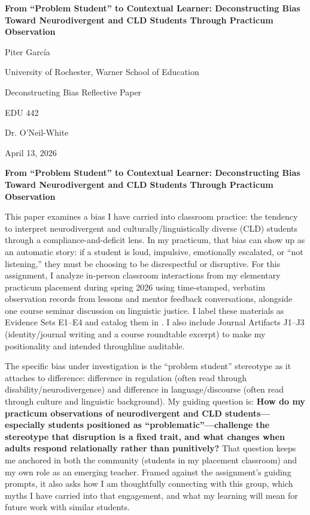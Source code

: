 \documentclass[12pt]{article}
\newcommand{\PaperTitle}{From ``Problem Student'' to Contextual Learner: Deconstructing Bias Toward Neurodivergent and CLD Students Through Practicum Observation}
\newcommand{\AuthorName}{Piter Garc\'ia}
\newcommand{\Affiliation}{University of Rochester, Warner School of Education}
\newcommand{\CourseName}{EDU 442}
\newcommand{\InstructorName}{Dr. O'Neil-White}
\newcommand{\DueDate}{April 13, 2026}
\newcommand{\AssignmentName}{Deconstructing Bias \textemdash{} Reflective Paper}
\newcommand{\apaheading}[1]{\begin{center}\textbf{#1}\end{center}}
\newcommand{\EvidenceSet}[1]{\textsc{E#1}}
\newcommand{\JournalArtifact}[1]{\textsc{J#1}}
\begin{document}
\begin{titlepage}
\thispagestyle{fancy}
\begin{center}
\vspace*{0.14\textheight}
{\Large\bfseries \PaperTitle\par}

\vspace{0.06\textheight}
{\AuthorName\par}
{\Affiliation\par}

\vspace{1.25\baselineskip}
{\AssignmentName\par}

\vspace{1.25\baselineskip}
{\CourseName\par}
{\InstructorName\par}
{\DueDate\par}
\vfill
\end{center}
\end{titlepage}

\setcounter{page}{2}

\apaheading{\PaperTitle}

This paper examines a bias I have carried into classroom practice: the tendency to interpret neurodivergent and culturally/linguistically diverse (CLD) students through a compliance-and-deficit lens. In my practicum, that bias can show up as an automatic story: if a student is loud, impulsive, emotionally escalated, or ``not listening,'' they must be choosing to be disrespectful or disruptive. For this assignment, I analyze in-person classroom interactions from my elementary practicum placement during spring 2026 using time-stamped, verbatim observation records from lessons and mentor feedback conversations, alongside one course seminar discussion on linguistic justice. I label these materials as Evidence Sets \EvidenceSet{1}--\EvidenceSet{4} and catalog them in . I also include Journal Artifacts \JournalArtifact{1}--\JournalArtifact{3} (identity/journal writing and a course roundtable excerpt) to make my positionality and intended throughline auditable.

The specific bias under investigation is the ``problem student'' stereotype as it attaches to difference: difference in regulation (often read through disability/neurodivergence) and difference in language/discourse (often read through culture and linguistic background). My guiding question is: \textbf{How do my practicum observations of neurodivergent and CLD students---especially students positioned as ``problematic''---challenge the stereotype that disruption is a fixed trait, and what changes when adults respond relationally rather than punitively?} That question keeps me anchored in both the community (students in my placement classroom) and my own role as an emerging teacher. Framed against the assignment's guiding prompts, it also asks how I am thoughtfully connecting with this group, which myths I have carried into that engagement, and what my learning will mean for future work with similar students.
\end{document}
